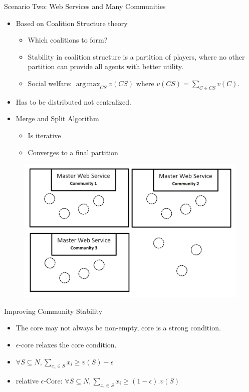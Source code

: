 \documentclass{beamer}
\begin{document}
\begin{frame}{Scenario Two: Web Services and Many Communities}
    \begin{itemize}
        \item Based on Coalition Structure theory
        \begin{itemize}
            \item Which coalitions to form?
            \item Stability in coalition structure is a partition of players, where no other partition can provide all agents with better utility.
            \item Social welfare: $\operatorname*{arg\,max}_{CS} v(CS)$ where $v(CS) = \sum_{C \in CS}v(C)$.
        \end{itemize}
        \item Has to be distributed not centralized.
        \item Merge and Split Algorithm {\footnotesize{\color{blue}{(Krzysztof R. Apt and Andreas Witzel)}}}
        \begin{itemize}
            \item Is iterative
            \item Converges to a final partition
        \end{itemize}
    \end{itemize}
    \begin{figure}[htbp]
        \centering
        \includegraphics[width=0.5 \columnwidth]{figures/scenario2.png}
    \end{figure}       	
\end{frame}

\begin{frame}{Improving Community Stability}
    \begin{itemize}
        \item The core may not always be non-empty, core is a strong condition.
        \item $\epsilon$-core relaxes the core condition.
        \item $\forall S \subseteq N, \sum_{x_i \in S} x_i \geq v(S) - \epsilon$
        \item relative $\epsilon$-Core: $\forall S \subseteq N, \sum_{x_i \in S} x_i \geq (1-\epsilon).v(S)$
    \end{itemize}
\end{frame}
\end{document}
